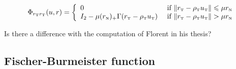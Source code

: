 \begin{equation}
  \label{eq:Phi-CKPS-II-rtrt}
  \Phi_{r_\t r_\t}(u,r) =
  \left\{
    \begin{array}{ll}
      0 & \text{ if }  \|r_{\t}  - \rho_{\t} u_{\t}\| \leq  \mu r_{\n}\\
      I_2-\mu (r_{\n})_+ \Gamma(r_{\t} - \rho_{\t} u_{\t})    &  \text{ if }
        \|r_{\t}  - \rho_{\t} u_{\t}\| >  \mu r_{\n}  \\
    \end{array}\right.
\end{equation}

\begin{ndrva}
  \begin{list}{*}{}
  \item     Is    there    a    difference    with    the    computation    of    Florent    in    his    thesis?
  \item
  \end{list}
\end{ndrva}


\subsection{Fischer-Burmeister function}


